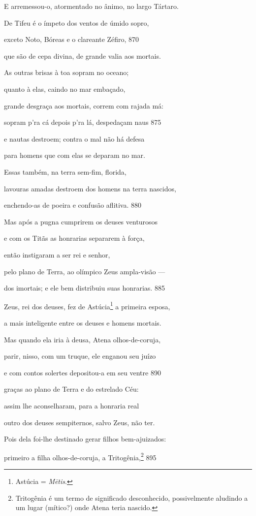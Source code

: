 E arremessou-o, atormentado no ânimo, no largo Tártaro.

\quad{}De Tifeu é o ímpeto dos ventos de úmido sopro,

exceto Noto, Bóreas e o clareante Zéfiro, \num{870}

que são de cepa divina, de grande valia aos mortais.

As outras brisas à toa sopram no oceano;

quanto à elas, caindo no mar embaçado,

grande desgraça aos mortais, correm com rajada má:

sopram p'ra cá depois p'ra lá, despedaçam naus \num{875}

e nautas destroem; contra o mal não há defesa

para homens que com elas se deparam no mar.

Essas também, na terra sem-fim, florida,

lavouras amadas destroem dos homens na terra nascidos,

enchendo-as de poeira e confusão aflitiva. \num{880}

\medskip

Mas após a pugna cumprirem os deuses venturosos

e com os Titãs as honrarias separarem à força,

então instigaram a ser rei e senhor,

pelo plano de Terra, ao olímpico Zeus ampla-visão ---

dos imortais; e ele bem distribuiu suas honrarias. \num{885}

\quad{}Zeus, rei dos deuses, fez de Astúcia\footnote{Astúcia = \emph{Mētis}.} a primeira esposa,

a mais inteligente entre os deuses e homens mortais.

Mas quando ela iria à deusa, Atena olhos-de-coruja,

parir, nisso, com um truque, ele enganou seu juízo

e com contos solertes depositou-a em seu ventre \num{890}

graças ao plano de Terra e do estrelado Céu:

assim lhe aconselharam, para a honraria real

outro dos deuses sempiternos, salvo Zeus, não ter.

Pois dela foi-lhe destinado gerar filhos bem-ajuizados:

primeiro a filha olhos-de-coruja, a Tritogênia,\footnote{Tritogênia é um termo de significado desconhecido, possivelmente
aludindo a um lugar (mítico?) onde Atena teria nascido.} \num{895}

